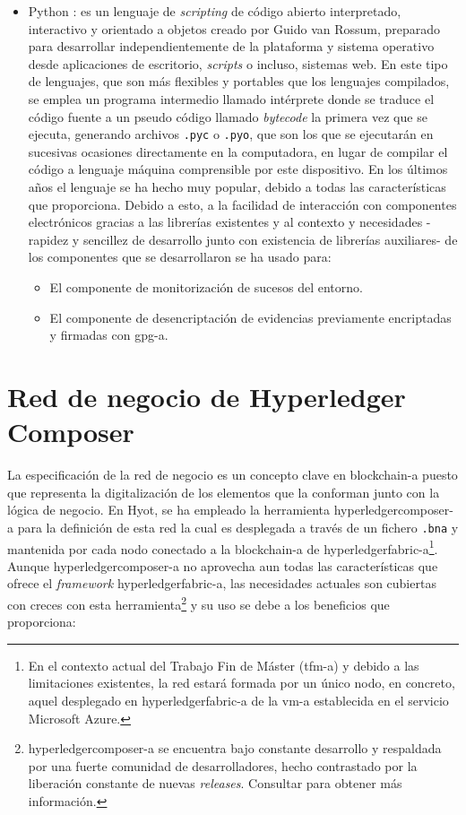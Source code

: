 \documentclass[12pt,a4paper, twoside]{report}
\begin{document}
\begin{itemize}
		\item Python \cite{python}: es un lenguaje de \textit{scripting} de código abierto interpretado, interactivo y orientado a objetos creado por Guido van Rossum, preparado para desarrollar independientemente de la plataforma y sistema operativo desde aplicaciones de escritorio, \textit{\glspl{script}} o incluso, sistemas web. En este tipo de lenguajes, que son más flexibles y portables que los lenguajes compilados, se emplea un programa intermedio llamado intérprete donde se traduce el código fuente a un pseudo código llamado \textit{bytecode} la primera vez que se ejecuta, generando archivos \texttt{.pyc} o \texttt{.pyo}, que son los que se ejecutarán en sucesivas ocasiones directamente en la computadora, en lugar de compilar el código a lenguaje máquina comprensible por este dispositivo. En los últimos años el lenguaje se ha hecho muy popular, debido a todas las características que proporciona. Debido a esto, a la facilidad de interacción con componentes electrónicos gracias a las librerías existentes y al contexto y necesidades -rapidez y sencillez de desarrollo junto con existencia de librerías auxiliares- de los componentes que se desarrollaron se ha usado para:
		
		\begin{itemize}
			\item El componente de monitorización de sucesos del entorno.
			\item El componente de desencriptación de evidencias previamente encriptadas  y firmadas con \gls{gpg-a}.
		\end{itemize}
	\end{itemize}
		
	\section{Red de negocio de Hyperledger Composer} \label{businessNetwork}
	
	La especificación de la red de negocio es un concepto clave en \gls{blockchain-a} puesto que representa la digitalización de los elementos que la conforman junto con la lógica de negocio. En Hyot, se ha empleado la herramienta \gls{hyperledgercomposer-a} para la definición de esta red la cual es desplegada a través de un fichero \texttt{.bna} y mantenida por cada nodo conectado a la \gls{blockchain-a} de \gls{hyperledgerfabric-a}\footnote{En el contexto actual del Trabajo Fin de Máster (\gls{tfm-a}) y debido a las limitaciones existentes, la red estará formada por un único nodo, en concreto, aquel desplegado en \gls{hyperledgerfabric-a} de la \gls{vm-a} establecida en el servicio Microsoft Azure.}. Aunque \gls{hyperledgercomposer-a} no aprovecha aun todas las características que ofrece el \textit{\gls{framework}} \gls{hyperledgerfabric-a}, las necesidades actuales son cubiertas con creces con esta herramienta\footnote{\gls{hyperledgercomposer-a} se encuentra bajo constante desarrollo y respaldada por una fuerte comunidad de desarrolladores, hecho contrastado por la liberación constante de nuevas \textit{releases}. Consultar \cite{hyperledgercomposer:releases} para obtener más información.} y su uso se debe a los beneficios que proporciona:
\end{document}
